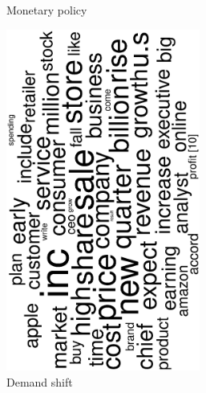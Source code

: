\begin{figure}
\begin{subfigure}{0.32\textwidth}
		\caption{Monetary policy}
	\end{subfigure}
	\begin{subfigure}{0.32\textwidth}
		\includegraphics[width=0.7\textwidth,angle=270]{figures/wordcloud9.eps}
		\caption{Demand shift}
	\end{subfigure}
	\begin{subfigure}{0.32\textwidth}

\end{subfigure}
\end{figure}
